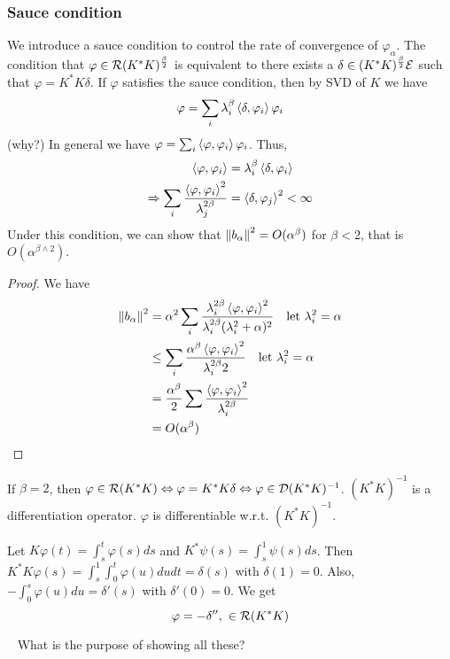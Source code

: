 \subsubsection{Sauce condition}
We introduce a sauce condition to control the rate of convergence of
$\varphi_\alpha$. The condition that $\varphi\in\mathcal{R}(K^*K)^{\frac{\beta}{2}}$
is equivalent to there exists a $\delta\in (K^*K)^{\frac{\beta}{2}}\mathcal{E}$ such
that $\varphi=K^*K\delta$. If $\varphi$ satisfies the sauce condition, then by
SVD of $K$ we have \begin{equation*}
    \varphi=\sum_i \lambda_i^\beta\left\langle \delta,\varphi_i\right\rangle\varphi_i
\end{equation*} {\color{red} (why?)}
In general we have $\varphi=\sum_i \left\langle \varphi,\varphi_i\right\rangle\varphi_i$.
Thus, \begin{align*}
    \left\langle \varphi,\varphi_i\right\rangle & =\lambda_i^\beta\left\langle \delta,\varphi_i\right\rangle \\ \Rightarrow \sum_i\frac{\left\langle \varphi,\varphi_i\right\rangle^2}{\lambda_j^{2\beta}}&=\left\langle \delta,\varphi_j\right\rangle^2 < \infty
\end{align*}
Under this condition, we can show that $\left\| b_\alpha \right\|^2 = O(\alpha^{\beta})$ for $\beta<2$, that is $O (\alpha^{\beta\wedge 2})$.
\begin{proof}
    We have \begin{equation*}
        \begin{split}
            \left\| b_\alpha \right\|^2&=\alpha^2\sum_i \frac{\lambda_i^{2\beta}\left\langle \varphi,\varphi_i\right\rangle^2}{\lambda_i^{2\beta}(\lambda_i^2+\alpha)^2} \quad \text{let } \lambda_i^2=\alpha\\
            &\leq \sum_i \frac{\alpha^\beta\left\langle \varphi,\varphi_i\right\rangle^2}{\lambda_i^{2\beta}2} \quad \text{let } \lambda_i^2=\alpha\\
            &=\frac{\alpha^\beta}{2}\sum \frac{\left\langle \varphi,\varphi_i\right\rangle^2}{\lambda_i^{2\beta}}\\
            &=O(\alpha^{\beta})
        \end{split}
    \end{equation*}
\end{proof}
If $\beta=2$, then $\varphi\in\mathcal{R}(K^*K) \Leftrightarrow \varphi=K^*K\delta\Leftrightarrow \varphi\in \mathcal{D}(K^*K)^{-1}$.
$(K^*K)^{-1}$ is a differentiation operator. $\varphi$ is differentiable w.r.t. $(K^*K)^{-1}$.
\begin{example}
    Let $K\varphi(t)=\int_s^t \varphi(s)ds$ and $K^*\psi(s)=\int_s^1 \psi(s)ds$. Then $K^*K\varphi(s)=\int_s^1\int_0^t\varphi(u)dudt=\delta(s)$ with $\delta(1)=0$. Also, $-\int_0^s \varphi(u)du=\delta'(s)$ with $\delta'(0)=0$. We get \begin{equation*}
        \varphi=-\delta'',\ \in \mathcal{R}(K^*K)
    \end{equation*}
\end{example}\
{\color{red} What is the purpose of showing all these?}

